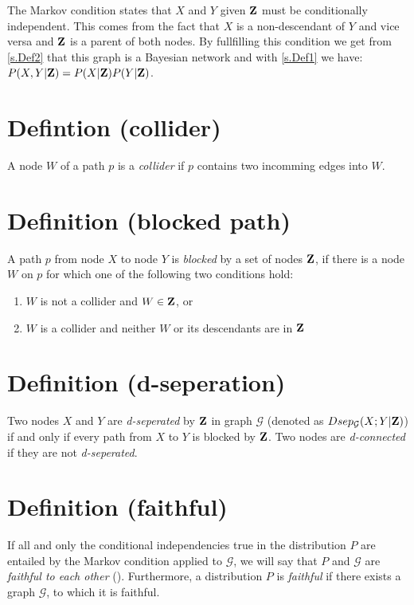 		The Markov condition states that $X$ and $Y$ given ${\textbf{Z}}$ must be conditionally independent. This comes from the fact that $X$ is a non-descendant of $Y$ and vice versa and ${\textbf{Z}}$ is a parent of both nodes. By fullfilling this condition we get from \autoref{s.Def2} that this graph is a Bayesian network and with \autoref{s.Def1} we have: $P(X , Y|{\textbf{Z}}) = P(X|{\textbf{Z}})P(Y|{\textbf{Z}})$.

	\section{Defintion (collider)} \label{s.Def4}

		A node $W$ of a path $p$ is a \textit{collider} if $p$ contains two incomming edges into $W$.

	\section{Definition (blocked path)} \label{s.Def5}

		A path $p$ from node $X$ to node $Y$ is \textit{blocked} by a set of nodes ${\textbf{Z}}$, if there is a node $W$ on $p$ for which one of the following two conditions hold:

		\begin{enumerate}
			\item $W$ is not a collider and $W \in {\textbf{Z}}$, or
			\item $W$ is a collider and neither $W$ or its descendants are in ${\textbf{Z}}$ \cite{P88}
		\end{enumerate}

	\section{Definition (d-seperation)} \label{s.Def6}

		Two nodes $X$ and $Y$ are \textit{d-seperated} by ${\textbf{Z}}$ in graph $\mathcal{G}$ (denoted as $Dsep_{\mathcal{G}}(X;Y|{\textbf{Z}})$) if and only if every path from $X$ to $Y$ is blocked by ${\textbf{Z}}$. Two nodes are \textit{d-connected} if they are not \textit{d-seperated}.

	\section{Definition (faithful)} \label{s.Def7}

		If all and only the conditional independencies true in the distribution $P$ are entailed by the Markov condition applied to $\mathcal{G}$, we will say that $P$ and $\mathcal{G}$ are \textit{faithful to each other} (\cite{SGSN}). Furthermore, a distribution $P$ is \textit{faithful} if there exists a graph $\mathcal{G}$, to which it is faithful.

